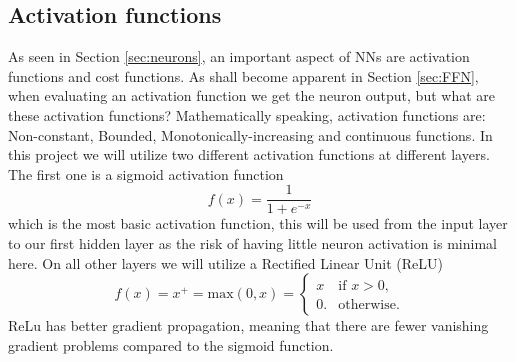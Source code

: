 \documentclass[12pt, a4paper]{book}
\begin{document}
\subsection{Activation functions}\label{sec:act}
As seen in Section \ref{sec:neurons}, an important aspect of NNs are activation functions and cost functions. As shall become apparent in Section \ref{sec:FFN}, when evaluating an activation function we get the neuron output, but what are these activation functions? 
Mathematically speaking, activation functions are: Non-constant, Bounded, Monotonically-increasing and continuous functions. In this project we will utilize two different activation functions at different layers. 
The first one is a sigmoid activation function
\begin{equation}\label{eq:sig}
    f(x) = \frac{1}{1+e^{-x}}
\end{equation}
which is the most basic activation function, this will be used from the input layer to our first hidden layer as the risk of having little neuron activation is minimal here. On all other layers we will utilize a Rectified Linear Unit (ReLU)
\begin{equation}\label{eq:ReLU}
    f(x) = x^+ = \text{max}(0,x) = \begin{cases}x&{\text{if }}x>0,\\0.&{\text{otherwise}}.\end{cases}
\end{equation}
ReLu has better gradient propagation, meaning that there are fewer vanishing gradient problems compared to the sigmoid function.
\end{document}
